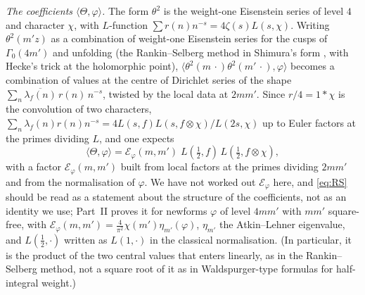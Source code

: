 \documentclass[11pt]{amsart}
\theoremstyle{remark}
\begin{document}
\emph{The coefficients $\langle\Theta,\varphi\rangle$.} The form $\theta^2$ is the weight-one Eisenstein series of level $4$ and character $\chi$, with $L$-function $\sum r(n)n^{-s}=4\zeta(s)L(s,\chi)$. Writing $\theta^2(m'z)$ as a combination of weight-one Eisenstein series for the cusps of $\Gamma_0(4m')$ and unfolding (the Rankin--Selberg method in Shimura's form \cite{Shimura}, with Hecke's trick at the holomorphic point), $\langle\theta^2(m\,\cdot)\theta^2(m'\,\cdot),\varphi\rangle$ becomes a combination of values at the centre of Dirichlet series of the shape $\sum_n\overline{\lambda_f(n)}\,r(n)\,n^{-s}$, twisted by the local data at $2mm'$. Since $r/4=1*\chi$ is the convolution of two characters, $\sum_n\lambda_f(n)r(n)n^{-s}=4L(s,f)L(s,f\otimes\chi)/L(2s,\chi)$ up to Euler factors at the primes dividing $L$, and one expects
\begin{equation}\label{eq:RS}
\langle\Theta,\varphi\rangle=\mathcal E_\varphi(m,m')\;L(\tfrac12,f)\,L(\tfrac12,f\otimes\chi),
\end{equation}
with a factor $\mathcal E_\varphi(m,m')$ built from local factors at the primes dividing $2mm'$ and from the normalisation of $\varphi$. We have not worked out $\mathcal E_\varphi$ here, and \eqref{eq:RS} should be read as a statement about the structure of the coefficients, not as an identity we use; Part~II \cite[Theorem~6.7]{ChenII} proves it for newforms $\varphi$ of level $4mm'$ with $mm'$ square-free, with $\mathcal E_\varphi(m,m')=\frac4{\pi^2}\chi(m')\eta_{m'}(\varphi)$, $\eta_{m'}$ the Atkin--Lehner eigenvalue, and $L(\frac12,\cdot)$ written as $L(1,\cdot)$ in the classical normalisation. (In particular, it is the product of the two central values that enters linearly, as in the Rankin--Selberg method, not a square root of it as in Waldspurger-type formulas for half-integral weight.)
\end{document}
